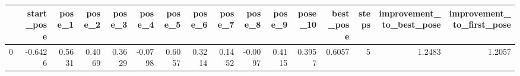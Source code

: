 \begin{tabular}{lrrrrrrrrrrrrrrr}
\toprule
{} &  start\_pose &  pose\_1 &  pose\_2 &  pose\_3 &  pose\_4 &  pose\_5 &  pose\_6 &  pose\_7 &  pose\_8 &  pose\_9 &  pose\_10 &  best\_pose &  steps &  improvement\_to\_best\_pose &  improvement\_to\_first\_pose \\
\midrule
0 &     -0.6426 &  0.5631 &  0.4069 &  0.3629 & -0.0798 &  0.6057 &  0.3214 &  0.1452 & -0.0097 &  0.4115 &   0.3957 &     0.6057 &      5 &                    1.2483 &                     1.2057 \\
\bottomrule
\end{tabular}
